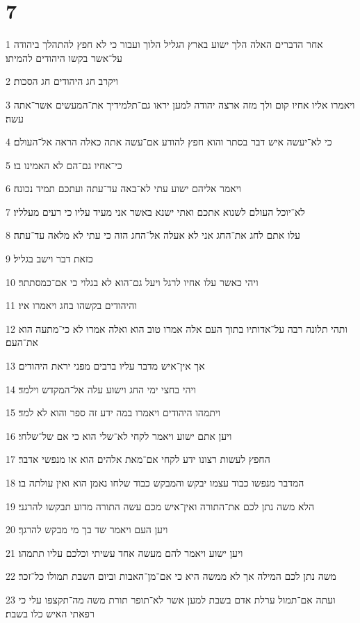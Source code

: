 \chapter{7}

\par 1 אחר הדברים האלה הלך ישוע בארץ הגליל הלוך ועבור כי לא חפץ להתהלך ביהודה על־אשר בקשו היהודים להמיתו׃
\par 2 ויקרב חג היהודים חג הסכות׃
\par 3 ויאמרו אליו אחיו קום ולך מזה ארצה יהודה למען יראו גם־תלמידיך את־המעשים אשר־אתה עשה׃
\par 4 כי לא־יעשה איש דבר בסתר והוא חפץ להודע אם־עשה אתה כאלה הראה אל־העולם׃
\par 5 כי־אחיו גם־הם לא האמינו בו׃
\par 6 ויאמר אליהם ישוע עתי לא־באה עד־עתה ועתכם תמיד נכונה׃
\par 7 לא־יוכל העולם לשנוא אתכם ואתי ישנא באשר אני מעיד עליו כי רעים מעלליו׃
\par 8 עלו אתם לחג את־החג אני לא אעלה אל־החג הזה כי עתי לא מלאה עד־עתה׃
\par 9 כזאת דבר וישב בגליל׃
\par 10 ויהי כאשר עלו אחיו לרגל ויעל גם־הוא לא בגלוי כי אם־כמסתתר׃
\par 11 והיהודים בקשהו בחג ויאמרו איו׃
\par 12 ותהי תלונה רבה על־אדותיו בתוך העם אלה אמרו טוב הוא ואלה אמרו לא כי־מתעה הוא את־העם׃
\par 13 אך אין־איש מדבר עליו ברבים מפני יראת היהודים׃
\par 14 ויהי בחצי ימי החג וישוע עלה אל־המקדש וילמד׃
\par 15 ויתמהו היהודים ויאמרו במה ידע זה ספר והוא לא למד׃
\par 16 ויען אתם ישוע ויאמר לקחי לא־שלי הוא כי אם של־שלחי׃
\par 17 החפץ לעשות רצונו ידע לקחי אם־מאת אלהים הוא או מנפשי אדבר׃
\par 18 המדבר מנפשו כבוד עצמו יבקש והמבקש כבוד שלחו נאמן הוא ואין עולתה בו׃
\par 19 הלא משה נתן לכם את־התורה ואין־איש מכם עשה התורה מדוע תבקשו להרגני׃
\par 20 ויען העם ויאמר שד בך מי מבקש להרגך׃
\par 21 ויען ישוע ויאמר להם מעשה אחד עשיתי וכלכם עליו תתמהו׃
\par 22 משה נתן לכם המילה אך לא ממשה היא כי אם־מן־האבות וביום השבת תמולו כל־זכר׃
\par 23 ועתה אם־תמול ערלת אדם בשבת למען אשר לא־תופר תורת משה מה־תקצפו עלי כי רפאתי האיש כלו בשבת׃
